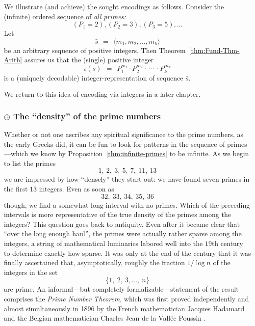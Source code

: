 We illustrate (and achieve) the sought encodings as follows.  Consider
the (infinite) ordered sequence of {\em all primes:}
\[ (P_1 = 2), (P_2 = 3), (P_3 = 5), \ldots  \]
Let
\begin{equation}
\label{eq:sequence-vec-s}
\bar{s} \ \ = \ \ \langle m_1, m_2, \ldots, m_k \rangle
\end{equation}
be an arbitrary sequence of positive integers.  Then
Theorem~\ref{thm:Fund-Thm-Arith} assures us that the (single) positive
integer
\[ 
\iota(\bar{s}) \ \ = \ \ P_1^{m_1} \cdot P_2^{m_2} \cdot \ \cdots \
\cdot P_k^{m_k}
\]
is a (uniquely decodable) integer-representation of sequence $\bar{s}$.

We return to this idea of encoding-via-integers in a later chapter.

\subsubsection{$\oplus$ The ``density'' of the prime numbers}
\label{sec:prime-density}


Whether or not one ascribes any spiritual significance to the prime
numbers, as the early Greeks did, it can be fun to look for patterns
in the sequence of primes---which we know by
Proposition~\ref{thm:infinite-primes} to be infinite.  As we begin to
list the primes
\[ 1, \ 2, \ 3, \ 5, \ 7, \ 11, \ 13 \]
we are impressed by how ``densely'' they start out: we have found
seven primes in the first $13$ integers.  Even as soon as 
\[ 32, \ 33, \ 34, \ 35, \ 36 \]
though, we find a somewhat long interval with no primes.  Which of the
preceding intervals is more representative of the true density of the
primes among the integers?  This question goes back to antiquity.
Even after it became clear that ``over the long enough haul'', the
primes were actually rather sparse among the integers, a string of
mathematical luminaries labored well into the $19$th century to
determine exactly how sparse.  It was only at the end of the century
that it was finally ascertained that, asymptotically, roughly the
fraction $1/ \log n$ of the integers in the set
\[ \{ 1, \ 2, \ 3, \ldots, \ n \} \]
are prime.  An informal---but completely formalizable---statement of
the result comprises the {\it Prime Number Theorem},
which was first proved independently and almost simultaneously in 1896
by the French mathematician Jacques Hadamard \index{Hadamard, Jacques}
\cite{Hadamard} and the Belgian mathematician Charles Jean de la
Vall\'{e}e Poussin \cite{Poussin}.

